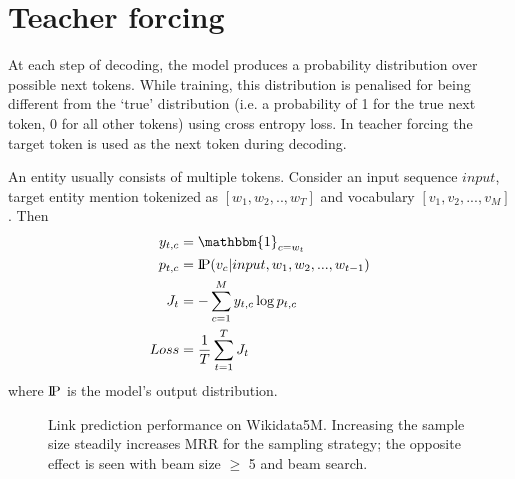 \documentclass[11pt]{article}
\renewcommand\:{\colon} \newcommand{\sset}[1]{\left\{\,#1\,\right\}} \newcommand{\ssets}[1]{\left\{#1\right\}} \newcommand{\ssetn}[1]{\{\,#1\,\}}
\newcommand{\probP}{\text{I\kern-0.15em P}}
\begin{document}
\section{Teacher forcing}
\label{sec:training_appendix}

At each step of decoding, the model produces a probability distribution over possible next tokens. While training, this distribution is penalised for being different from the `true' distribution (i.e. a probability of 1 for the true next token, 0 for all other tokens) using cross entropy loss. In teacher forcing \cite{teacher_forcing} the target token is used as the next token during decoding.

An entity usually consists of multiple tokens. Consider an input sequence $input$, target entity mention tokenized as $[w_1, w_2,..,w_T]$ and vocabulary $[v_1,v_2,...,v_M]$. Then
\begin{equation*}
\begin{aligned}
    y_{t,c} &= \mathbbm{1}_{c = w_t} \\
    p_{t,c} &= \probP(v_c | input, w_1, w_2, ..., w_{t-1}) \\
    J_t &= - \sum_{c=1}^{M} y_{t,c}\log p_{t,c} \\
    Loss &= \frac{1}{T}\sum_{t=1}^T J_t
\end{aligned}
\end{equation*}
where $\probP$ is the model's output distribution.

\begin{figure}[t!]
  \centering
     \caption{Link prediction performance on Wikidata5M. Increasing the sample size steadily increases MRR for the sampling strategy; the opposite effect is seen with beam size $\geq$ 5 and beam search.}
  \label{fig:beam-sample-plot}
\end{figure}
\end{document}
